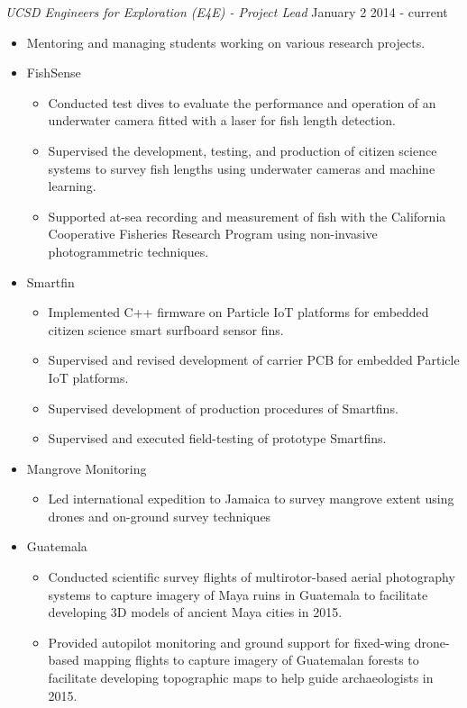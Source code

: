 \documentclass[line,margin]{res}
\begin{document}
\begin{resume}
	{\sl UCSD Engineers for Exploration (E4E) - Project Lead} \hfill January 2 2014 - current
	\begin{itemize}
		\item Mentoring and managing students working on various research projects.
		\item FishSense
		\begin{itemize}
			\item Conducted test dives to evaluate the performance and operation of an underwater camera fitted with a laser for fish length detection.
			\item Supervised the development, testing, and production of citizen science systems to survey fish lengths using underwater cameras and machine learning.
			\item Supported at-sea recording and measurement of fish with the California Cooperative Fisheries Research Program using non-invasive photogrammetric techniques.
		\end{itemize}
		\item Smartfin
		\begin{itemize}
			\item Implemented C++ firmware on Particle IoT platforms for embedded citizen science smart surfboard sensor fins.
			\item Supervised and revised development of carrier PCB for embedded Particle IoT platforms.
			\item Supervised development of production procedures of Smartfins.
			\item Supervised and executed field-testing of prototype Smartfins.
		\end{itemize}
		\item Mangrove Monitoring
		\begin{itemize}
			\item Led international expedition to Jamaica to survey mangrove extent using drones and on-ground survey techniques
		\end{itemize}
		\item Guatemala
		\begin{itemize}
			\item Conducted scientific survey flights of multirotor-based aerial photography systems to capture imagery of Maya ruins in Guatemala to facilitate developing 3D models of ancient Maya cities in 2015.
			\item Provided autopilot monitoring and ground support for fixed-wing drone-based mapping flights to capture imagery of Guatemalan forests to facilitate developing topographic maps to help guide archaeologists in 2015.

\end{itemize}
\end{itemize}
\end{resume}
\end{document}
